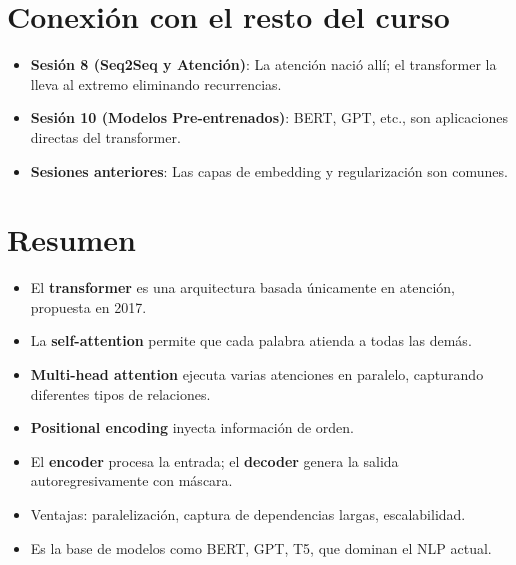 \documentclass[12pt,a4paper,openany,oneside]{book}
\begin{document}
\section{Conexión con el resto del curso}
\begin{itemize}
    \item \textbf{Sesión 8 (Seq2Seq y Atención)}: La atención nació allí; el transformer la lleva al extremo eliminando recurrencias.
    \item \textbf{Sesión 10 (Modelos Pre-entrenados)}: BERT, GPT, etc., son aplicaciones directas del transformer.
    \item \textbf{Sesiones anteriores}: Las capas de embedding y regularización son comunes.
\end{itemize}

\section{Resumen}
\begin{itemize}
    \item El \textbf{transformer} es una arquitectura basada únicamente en atención, propuesta en 2017.
    \item La \textbf{self-attention} permite que cada palabra atienda a todas las demás.
    \item \textbf{Multi-head attention} ejecuta varias atenciones en paralelo, capturando diferentes tipos de relaciones.
    \item \textbf{Positional encoding} inyecta información de orden.
    \item El \textbf{encoder} procesa la entrada; el \textbf{decoder} genera la salida autoregresivamente con máscara.
    \item Ventajas: paralelización, captura de dependencias largas, escalabilidad.
    \item Es la base de modelos como BERT, GPT, T5, que dominan el NLP actual.
\end{itemize}
\end{document}
